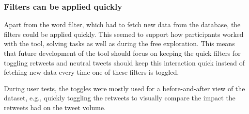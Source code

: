 \subsubsection*{Filters can be applied quickly}
Apart from the word filter, which had to fetch new data from the database, the filters could be applied quickly. This seemed to support how participants worked with the tool, solving tasks as well as during the free exploration. This means that future development of the tool should focus on keeping the quick filters for toggling retweets and neutral tweets should keep this interaction quick instead of fetching new data every time one of these filters is toggled.

During user tests, the toggles were mostly used for a before-and-after view of the dataset, e.g., quickly toggling the retweets to visually compare the impact the retweets had on the tweet volume. 
